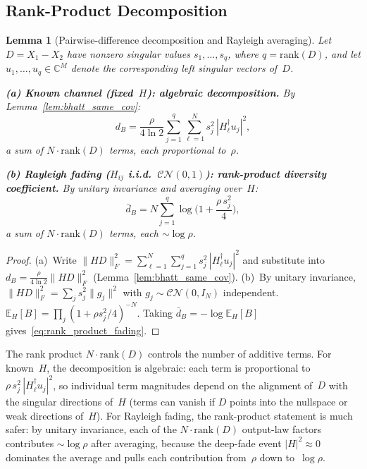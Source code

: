 \documentclass[lettersize,onecolumn]{IEEEtran}
\newtheorem{lemma}{Lemma}
\newcommand{\E}{\mathbb{E}}
\newcommand{\C}{\mathbb{C}}
\newcommand{\snr}{\rho}
\begin{document}
\subsection{Rank-Product Decomposition}\label{app:rank_product}

\begin{lemma}[Pairwise-difference decomposition and Rayleigh
averaging]\label{lem:rank_product}
Let $D = X_1 - X_2$ have nonzero singular values
$s_1,\dots,s_q$, where $q = \mathrm{rank}(D)$, and let
$u_1,\dots,u_q \in \C^M$ denote the corresponding left singular
vectors of~$D$.

\textbf{(a) Known channel (fixed~$H$): algebraic decomposition.}
By Lemma~\ref{lem:bhatt_same_cov}:
\begin{equation}\label{eq:rank_product_det}
d_B = \frac{\snr}{4\ln 2}\sum_{j=1}^{q}\sum_{\ell=1}^{N}
s_j^2\,|H_\ell^\dagger u_j|^2,
\end{equation}
a sum of $N\!\cdot\!\mathrm{rank}(D)$ terms, each proportional
to~$\snr$.

\textbf{(b) Rayleigh fading ($H_{ij}$ i.i.d.\
$\mathcal{CN}(0,1)$): rank-product diversity coefficient.}
By unitary invariance and averaging over~$H$:
\begin{equation}\label{eq:rank_product_fading}
\bar{d}_B = N\sum_{j=1}^{q}\log\!\Big(1+\frac{\snr\,s_j^2}{4}
\Big),
\end{equation}
a sum of $N\!\cdot\!\mathrm{rank}(D)$ terms, each $\sim\log\snr$.
\end{lemma}
\begin{proof}
(a)~Write $\|HD\|_F^2 = \sum_{\ell=1}^{N}\sum_{j=1}^{q}
s_j^2\,|H_\ell^\dagger u_j|^2$ and substitute
into $d_B = \frac{\snr}{4\ln 2}\|HD\|_F^2$
(Lemma~\ref{lem:bhatt_same_cov}).
(b)~By unitary invariance,
$\|HD\|_F^2 = \sum_j s_j^2\|g_j\|^2$ with
$g_j \sim \mathcal{CN}(0,I_N)$ independent.
$\E_H[B] = \prod_j(1+\snr s_j^2/4)^{-N}$.
Taking $\bar{d}_B = -\log\E_H[B]$
gives~\eqref{eq:rank_product_fading}.
\end{proof}

The rank product $N\!\cdot\!\mathrm{rank}(D)$ controls the number
of additive terms. For known~$H$, the decomposition is algebraic:
each term is proportional to $\snr\,s_j^2\,|H_\ell^\dagger
u_j|^2$, so individual term magnitudes depend on the alignment
of~$D$ with the singular directions of~$H$ (terms can vanish if
$D$ points into the nullspace or weak directions of~$H$). For
Rayleigh fading, the rank-product statement is much safer:
by unitary invariance, each of the $N\!\cdot\!\mathrm{rank}(D)$
output-law factors contributes $\sim\log\snr$ after averaging,
because the
deep-fade event $|H|^2 \approx 0$ dominates the average and
pulls each contribution from~$\snr$ down to~$\log\snr$.
\end{document}
